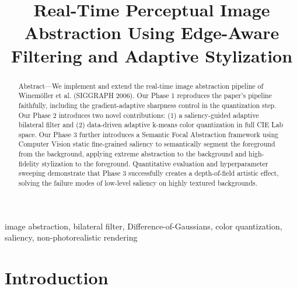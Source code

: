 \documentclass[conference]{IEEEtran}
\begin{document}
\title{Real-Time Perceptual Image Abstraction Using Edge-Aware Filtering and Adaptive Stylization}

\author{
  \and
}
\maketitle

\begin{abstract}
Abstract---We implement and extend the real-time image abstraction pipeline of Winemöller et al. \cite{winemoller2006} (SIGGRAPH 2006). Our Phase 1 reproduces the paper's pipeline faithfully, including the gradient-adaptive sharpness control in the quantization step. Our Phase 2 introduces two novel contributions: (1) a saliency-guided adaptive bilateral filter and (2) data-driven adaptive k-means color quantization in full CIE Lab space. Our Phase 3 further introduces a Semantic Focal Abstraction framework using Computer Vision static fine-grained saliency to semantically segment the foreground from the background, applying extreme abstraction to the background and high-fidelity stylization to the foreground. Quantitative evaluation and hyperparameter sweeping demonstrate that Phase 3 successfully creates a depth-of-field artistic effect, solving the failure modes of low-level saliency on highly textured backgrounds.
\end{abstract}

\begin{IEEEkeywords}
image abstraction, bilateral filter, Difference-of-Gaussians, color quantization, saliency, non-photorealistic rendering
\end{IEEEkeywords}

\section{Introduction}
\end{document}
